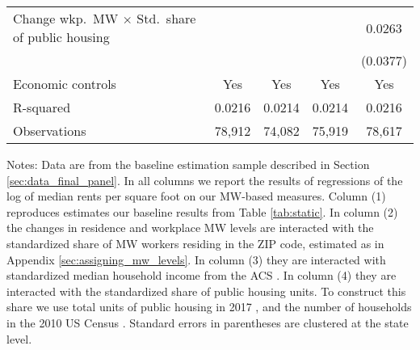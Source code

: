 \begin{table}[hbt!]
\begin{tabular}{@{}lcccc@{}}
        Change wkp.\ MW $\times$ Std.\ share of public housing &        &       &        &  0.0263   \\
                                                               &        &       &        & (0.0377)  \\ \midrule
        Economic controls                                      &  Yes   &  Yes  &   Yes  &  Yes   \\
        R-squared                                              &  0.0216   &  0.0214  &   0.0214  &  0.0216   \\
        Observations                                           &  78,912  &  74,082 &   75,919 &  78,617  \\ \bottomrule
    \end{tabular}

    \begin{minipage}{.95\linewidth} \footnotesize
        \vspace{2mm}
        Notes: 
        Data are from the baseline estimation sample described in Section 
        \ref{sec:data_final_panel}.
        In all columns we report the results of regressions of the log of median 
        rents per square foot on our MW-based measures.
        Column (1) reproduces estimates our baseline results from Table 
        \ref{tab:static}.
        In column (2) the changes in residence and workplace MW levels are 
        interacted with the standardized share of MW workers residing in 
        the ZIP code, estimated as in Appendix \ref{sec:assigning_mw_levels}.
        In column (3) they are interacted with standardized median household 
        income from the ACS \parencite{CensusACS}.
        In column (4) they are interacted with the standardized share of 
        public housing units.
        To construct this share we use total units of public housing in 2017 
        \parencite{hudHousing}, and the number of households in the 2010
        US Census \parencite{CensusDecennial}.
        Standard errors in parentheses are clustered at the state level.
    \end{minipage}
\end{table}
